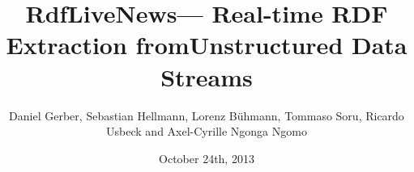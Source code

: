 \documentclass{beamer}
\title[RdfLiveNews]{RdfLiveNews\newline --- \newline Real-time RDF Extraction from\newline Unstructured Data Streams}
\author{Daniel Gerber, Sebastian Hellmann, Lorenz Bühmann, Tommaso Soru, Ricardo Usbeck and Axel-Cyrille Ngonga Ngomo} %
\institute[AKSW] %
{
University of Leipzig \\ %
\medskip
\textit{ngonga@informatik.uni-leipzig.de} %
}
\date{October 24th, 2013} %
\begin{document}
\begin{frame}
\titlepage %
\end{frame}

\end{document}
